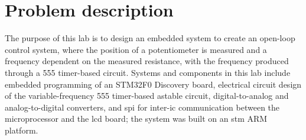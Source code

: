 
\section{Problem description}
The purpose of this lab is to design an embedded system to create an
open-loop control system, where the position of a potentiometer is
measured and a frequency dependent on the measured resistance, with the
frequency produced through a 555 timer-based circuit. Systems and
components in this lab include embedded programming of an STM32F0
Discovery board, electrical circuit design of the variable-frequency 555
timer-based astable circuit, digital-to-analog and analog-to-digital
converters, and \gls{spi} for inter-\gls{ic} communication between the
microprocessor and the \gls{lcd} board; the system was built on an
\gls{stm} ARM platform.
